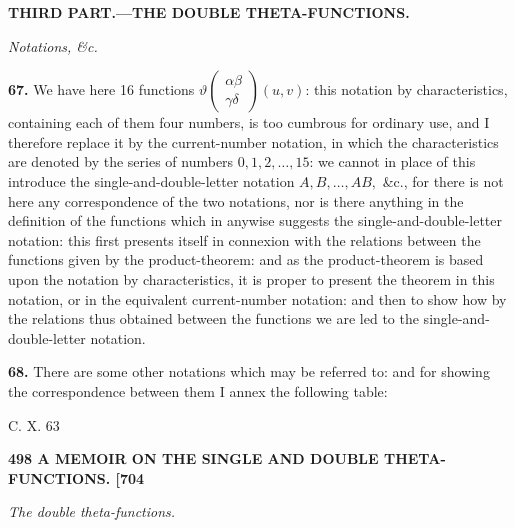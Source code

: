 \documentclass[11pt]{article}
\begin{document}
\bigskip
\begin{center}\textbf{THIRD PART.---THE DOUBLE THETA-FUNCTIONS.}\end{center}

\medskip
\begin{center}\textit{Notations, \&c.}\end{center}

\textbf{67.} We have here 16 functions $\vartheta\!\begin{pmatrix}\alpha\beta\\ \gamma\delta\end{pmatrix}\!(u,v)$: this notation by characteristics, containing each of them four numbers, is too cumbrous for ordinary use, and I therefore replace it by the current-number notation, in which the characteristics are denoted by the series of numbers $0, 1, 2, \ldots, 15$: we cannot in place of this introduce the single-and-double-letter notation $A,B,\ldots,AB,$ \&c., for there is not here any correspondence of the two notations, nor is there anything in the definition of the functions which in anywise suggests the single-and-double-letter notation: this first presents itself in connexion with the relations between the functions given by the product-theorem: and as the product-theorem is based upon the notation by characteristics, it is proper to present the theorem in this notation, or in the equivalent current-number notation: and then to show how by the relations thus obtained between the functions we are led to the single-and-double-letter notation.

\medskip
\textbf{68.} There are some other notations which may be referred to: and for showing the correspondence between them I annex the following table:

\medskip
\hfill C. X. \hfill 63

\bigskip
\noindent\textbf{498 \hfill A MEMOIR ON THE SINGLE AND DOUBLE THETA-FUNCTIONS. \hfill [704}

\medskip
\begin{center}\textit{The double theta-functions.}\end{center}
\end{document}

